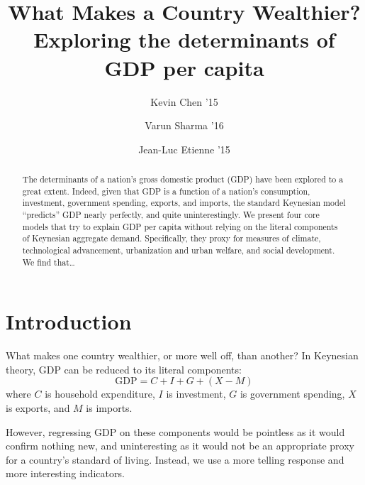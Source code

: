 \documentclass[12pt]{article}
\title{
  \sc
  What Makes a Country Wealthier? \\
  {\large Exploring the determinants of GDP per capita}
}
\author{
    {\rm Kevin Chen '15} \\ 
    \and
    {\rm Varun Sharma '16} \\ 
    \and
    {\rm Jean-Luc Etienne '15} \\ 
}
\begin{document}
\date{}
\maketitle
\doublespacing


\begin{abstract}
The determinants of a nation's gross domestic product (GDP) have been explored to a great extent. Indeed, given that GDP is a function of a nation's consumption, investment, government spending, exports, and imports, the standard Keynesian model ``predicts'' GDP nearly perfectly, and quite uninterestingly. We present four core models that try to explain GDP per capita without relying on the literal components of Keynesian aggregate demand. Specifically, they proxy for measures of climate, technological advancement, urbanization and urban welfare, and social development.
We find that\dots %
\end{abstract}

\newpage








\section{Introduction}
What makes one country wealthier, or more well off, than another? In Keynesian theory, GDP can be reduced to its literal components:
$$\mathrm{GDP} = C + I + G + (X - M)$$
where $C$ is household expenditure, $I$ is investment,  $G$ is government spending, $X$ is exports, and $M$ is imports.

However, regressing GDP on these components would be pointless as it would confirm nothing new, and uninteresting as it would not be an appropriate proxy for a country's standard of living. Instead, we use a more telling response and more interesting indicators.
\end{document}
